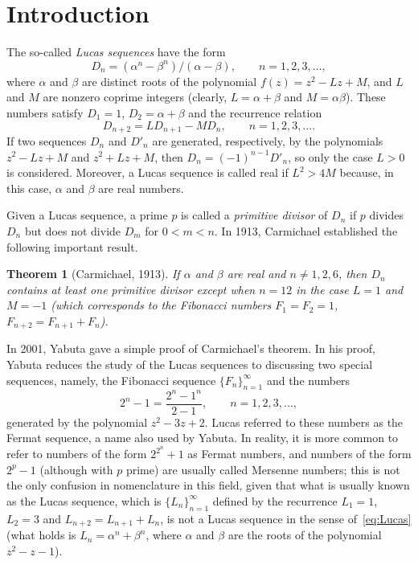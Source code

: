 \documentclass[11pt, a4paper]{article}
\theoremstyle{plain}
\newtheorem{theorem}{Theorem}
\theoremstyle{definition}
\begin{document}
\section{Introduction}

The so-called \textit{Lucas sequences} \cite{Lucas} have the form
\begin{equation}
\label{eq:Lucas}
  D_n = (\alpha^n-\beta^n)/(\alpha-\beta), \qquad n=1,2,3,\dots,
\end{equation}
where $\alpha$ and $\beta$ are distinct roots of the polynomial $f(z) = z^2 - Lz + M$, 
and $L$ and $M$ are nonzero coprime integers (clearly, $L=\alpha+\beta$ and $M=\alpha\beta$). 
These numbers satisfy $D_1 = 1$, $D_2 = \alpha+\beta$
and the recurrence relation
\[
  D_{n+2} = L D_{n+1} - M D_{n}, \qquad n=1,2,3,\dots.
\]
If two sequences $D_n$ and $D'_n$ are generated, respectively, by the polynomials $z^2 - Lz + M$ and $z^2 + Lz + M$,
then $D_n = (-1)^{n-1} D'_n$, so only the case $L>0$ is considered.
Moreover, a Lucas sequence is called real if $L^2 > 4M$ because, in this case, $\alpha$ and $\beta$ are real numbers.

Given a Lucas sequence, a prime $p$ is called a \textit{primitive divisor} of $D_n$ if $p$ divides $D_n$ but does not divide $D_m$ for $0<m<n$. 
In 1913, Carmichael \cite{Car} established the following important result.

\begin{theorem}[Carmichael, 1913]
If $\alpha$ and $\beta$ are real and $n \ne 1,2,6$, then $D_n$ contains at least one primitive divisor except when
$n = 12$ in the case $L = 1$ and $M = -1$ (which corresponds to the Fibonacci numbers $F_1=F_2=1$, $F_{n+2}=F_{n+1}+F_{n}$).
\end{theorem}


In 2001, Yabuta \cite{Ya} gave a simple proof of Carmichael's theorem. In his proof, Yabuta reduces the study of the Lucas sequences to discussing two special sequences, namely, the Fibonacci sequence $\{F_n\}_{n=1}^{\infty}$ and the numbers
\[
  2^n - 1 = \frac{2^n-1^n}{2-1}, \qquad n=1,2,3,\dots,
\]
generated by the polynomial $z^2 - 3z + 2$. Lucas \cite{Lucas} referred to these numbers as the Fermat sequence, a name also used by Yabuta. 
In reality, it is more common to refer to numbers of the form $2^{2^n}+1$ as Fermat numbers, and numbers of the form $2^p - 1$ (although with $p$ prime) are usually called Mersenne numbers; this is not the only confusion in nomenclature in this field, given that what is usually known as the Lucas sequence, which is $\{L_n\}_{n=1}^{\infty}$ defined by the recurrence $L_1=1$, $L_2=3$ and $L_{n+2} = L_{n+1} + L_{n}$, is not a Lucas sequence in the sense of~\eqref{eq:Lucas} (what holds is $L_n = \alpha^n+\beta^n$, where $\alpha$ and $\beta$ are the roots of the polynomial $z^2-z-1$).
\end{document}
